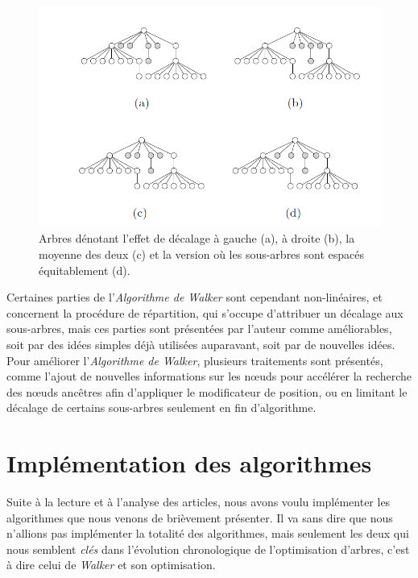 \documentclass{article}
\begin{document}
  
  \vfill
  \begin{figure}[h]
    \begin{center}
        \includegraphics[scale=0.4]{comparArbresBuchheim.png}
    \end{center}
    \caption{Arbres dénotant l'effet de décalage à gauche (a), à droite (b), la moyenne des deux (c) et la version où les sous-arbres sont espacés équitablement (d).
	\cite{article02}}
  \label{fig:comparArbresBuchheim}
\end{figure}
\vfill

Certaines parties de l'\emph{Algorithme de Walker} sont cependant non-linéaires, et concernent la procédure de répartition, qui s'occupe d'attribuer un décalage aux sous-arbres, mais ces parties sont présentées par l'auteur comme améliorables, soit par des idées simples déjà utilisées auparavant, soit par de nouvelles idées.\\

Pour améliorer l'\emph{Algorithme de Walker}, plusieurs traitements sont présentés, comme l'ajout de nouvelles informations sur les n\oe{}uds pour accélérer la recherche des n\oe{}uds ancêtres afin d'appliquer le modificateur de position, ou en limitant le décalage de certains sous-arbres seulement en fin d'algorithme.\\

\newpage
\section{Implémentation des algorithmes}

Suite à la lecture et à l'analyse des articles, nous avons voulu implémenter les algorithmes que nous venons de brièvement présenter. Il va sans dire que nous n'allions pas implémenter la totalité des algorithmes, mais seulement les deux qui nous semblent \emph{clés} dans l'évolution chronologique de l'optimisation d'arbres, c'est à dire celui de \emph{Walker} et son optimisation.\\
\end{document}
